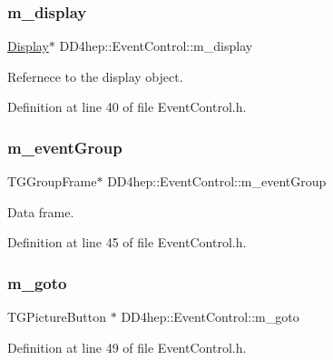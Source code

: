 \subsubsection{\texorpdfstring{m\+\_\+display}{m\_display}}
{\footnotesize\ttfamily \hyperlink{class_d_d4hep_1_1_display}{Display}$\ast$ D\+D4hep\+::\+Event\+Control\+::m\+\_\+display\hspace{0.3cm}{\ttfamily [private]}}



Refernece to the display object. 



Definition at line 40 of file Event\+Control.\+h.

\hypertarget{class_d_d4hep_1_1_event_control_a26358da45905074e309f36f245558a92}{}\label{class_d_d4hep_1_1_event_control_a26358da45905074e309f36f245558a92} 
\subsubsection{\texorpdfstring{m\+\_\+event\+Group}{m\_eventGroup}}
{\footnotesize\ttfamily T\+G\+Group\+Frame$\ast$ D\+D4hep\+::\+Event\+Control\+::m\+\_\+event\+Group\hspace{0.3cm}{\ttfamily [private]}}



Data frame. 



Definition at line 45 of file Event\+Control.\+h.

\hypertarget{class_d_d4hep_1_1_event_control_ac6976dc6f6e1356fa5e6243338f41d05}{}\label{class_d_d4hep_1_1_event_control_ac6976dc6f6e1356fa5e6243338f41d05} 
\subsubsection{\texorpdfstring{m\+\_\+goto}{m\_goto}}
{\footnotesize\ttfamily T\+G\+Picture\+Button $\ast$ D\+D4hep\+::\+Event\+Control\+::m\+\_\+goto\hspace{0.3cm}{\ttfamily [private]}}



Definition at line 49 of file Event\+Control.\+h.

